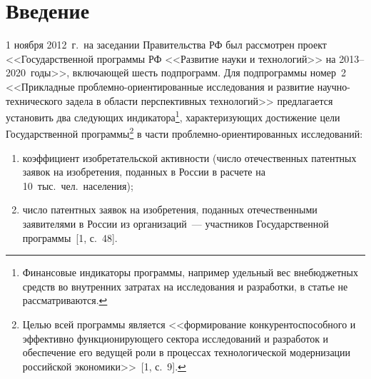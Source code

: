 \vspace*{3pt}


      \thispagestyle{headings}

      \begin{multicols}{2}

            \label{st\stat}

\section{Введение}

    1 ноября 2012~г.\ на заседании Правительства РФ был рассмотрен проект 
<<Государственной программы РФ <<Развитие науки и технологий>> на 2013--2020~годы>>, 
включающей шесть подпрограмм. Для подпрограммы номер~2 <<Прикладные 
проб\-лем\-но-ори\-ен\-ти\-ро\-ван\-ные исследования и развитие на\-уч\-но-тех\-ни\-че\-ско\-го задела в области 
перспективных технологий>> предлагается установить два следующих индикатора\footnote[5]{Финансовые 
индикаторы программы, например удельный вес внебюджетных средств во внутренних затратах на 
исследования и разработки, в статье не рассматриваются.}, характеризующих достижение цели 
Государственной программы\footnote[6]{Целью всей программы является <<формирование 
конкурентоспособного и эффективно функционирующего сектора исследований и разработок и 
обеспечение его ведущей роли в процессах технологической модернизации российской 
экономики>>~[1, с.~9].} в части проб\-лем\-но-ори\-ен\-ти\-ро\-ван\-ных исследований:
\begin{enumerate}[(1)]
\item  коэффициент изобретательской активности (число отечественных патентных заявок на 
изобретения, поданных в России в расчете на 10~тыс.\ чел.\ населения);
    \item число патентных заявок на изобретения, поданных отечественными заявителями в 
России из организаций~--- участников Государственной программы~[1, с.~48].
    \end{enumerate}
    

\end{multicols}

